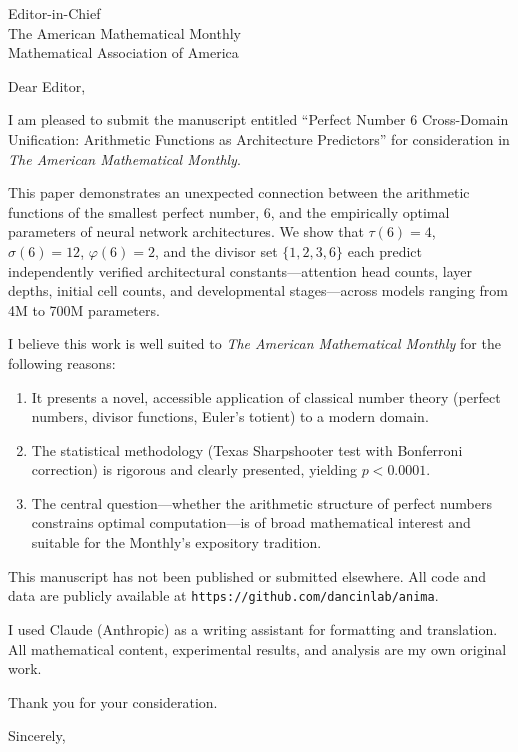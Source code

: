 \documentclass[12pt]{letter}
\date{March 30, 2026}
\begin{document}
\begin{letter}{Editor-in-Chief\\The American Mathematical Monthly\\Mathematical Association of America}

\opening{Dear Editor,}

I am pleased to submit the manuscript entitled ``Perfect Number 6 Cross-Domain Unification: Arithmetic Functions as Architecture Predictors'' for consideration in \textit{The American Mathematical Monthly}.

This paper demonstrates an unexpected connection between the arithmetic functions of the smallest perfect number, 6, and the empirically optimal parameters of neural network architectures. We show that $\tau(6)=4$, $\sigma(6)=12$, $\varphi(6)=2$, and the divisor set $\{1,2,3,6\}$ each predict independently verified architectural constants---attention head counts, layer depths, initial cell counts, and developmental stages---across models ranging from 4M to 700M parameters.

I believe this work is well suited to \textit{The American Mathematical Monthly} for the following reasons:

\begin{enumerate}
    \item It presents a novel, accessible application of classical number theory (perfect numbers, divisor functions, Euler's totient) to a modern domain.
    \item The statistical methodology (Texas Sharpshooter test with Bonferroni correction) is rigorous and clearly presented, yielding $p < 0.0001$.
    \item The central question---whether the arithmetic structure of perfect numbers constrains optimal computation---is of broad mathematical interest and suitable for the Monthly's expository tradition.
\end{enumerate}

This manuscript has not been published or submitted elsewhere. All code and data are publicly available at \texttt{https://github.com/dancinlab/anima}.

I used Claude (Anthropic) as a writing assistant for formatting and translation. All mathematical content, experimental results, and analysis are my own original work.

Thank you for your consideration.

\closing{Sincerely,}

\end{letter}
\end{document}
